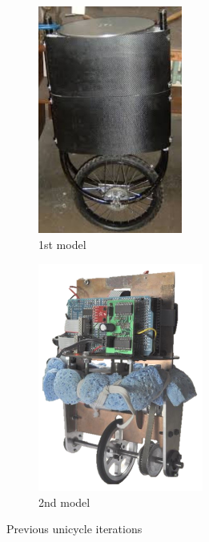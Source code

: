 \documentclass[twoside,twocolumn,12pt]{article}
\begin{document}
\begin{figure}[b!]
  \centering
  \begin{subfigure}[t]{0.325\textwidth}
    \includegraphics[width=\linewidth,height=7.5cm]{first}
   \caption{1st model \cite{roderigo}}
  \label{sub:old1}
  \end{subfigure}
  \begin{subfigure}[t]{0.325\textwidth}
    \includegraphics[width=\linewidth,height=7.5cm]{old_unicycle}
    \caption{2nd model \cite{eric}}
  \label{sub:old2}
  \end{subfigure}
  \caption{Previous unicycle iterations}
  \label{fig:unimodels}
\end{figure}
\end{document}
